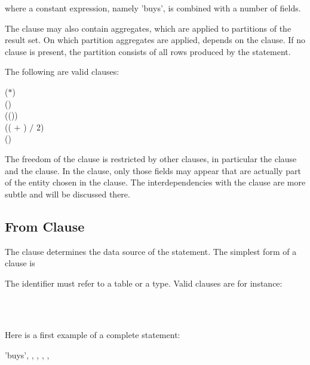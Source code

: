 where a constant expression, namely 'buys',
is combined with a number of fields.

The  clause may also contain aggregates,
which are applied to partitions of the result set.
On which partition
aggregates are applied, depends 
on the  clause. If no  clause
is present, the partition consists of all rows produced
by the  statement.

The following are valid  clauses:

 ($\ast$) \\
 () \\
 (()) \\
 (( $+$
                                   ) $/$ 2) \\
 ()

The freedom of the  clause
is restricted by other clauses, in particular
the  clause and the  clause.
In the  clause, only
those fields may appear that are actually
part of the entity chosen in the  clause.
The interdependencies with the  clause
are more subtle and will be discussed there.

\subsection{From Clause}
The  clause determines the data source
of the  statement. The simplest form
of a  clause is

 

The identifier must refer to a table or a type.
Valid  clauses are for instance:

  \\
  \\
 

Here is a first example of a complete  statement:

 'buys', ,
                         , 
                         , 
                         ,
 

